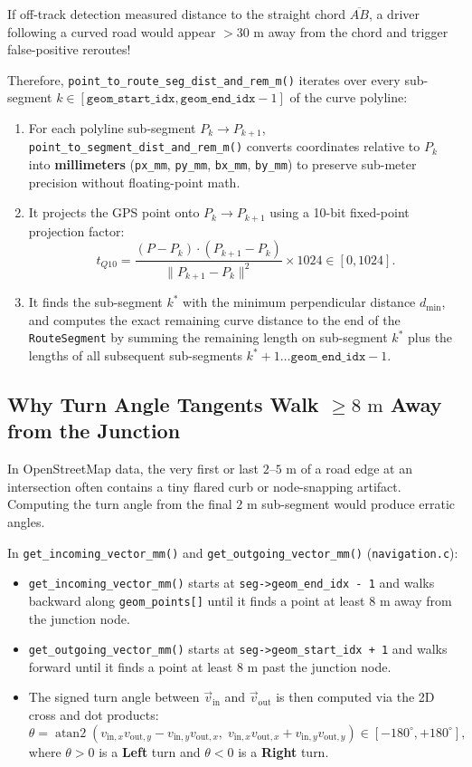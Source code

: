 \documentclass[11pt,a4paper]{article}
\begin{document}
If off-track detection measured distance to the straight chord $\overline{AB}$, a driver following a curved road would appear $>30\text{ m}$ away from the chord and trigger false-positive reroutes!

Therefore, \texttt{point\_to\_route\_seg\_dist\_and\_rem\_m()} iterates over every sub-segment $k \in [\texttt{geom\_start\_idx}, \texttt{geom\_end\_idx} - 1]$ of the curve polyline:
\begin{enumerate}
    \item For each polyline sub-segment $P_k \to P_{k+1}$, \texttt{point\_to\_segment\_dist\_and\_rem\_m()} converts coordinates relative to $P_k$ into \textbf{millimeters} (\texttt{px\_mm}, \texttt{py\_mm}, \texttt{bx\_mm}, \texttt{by\_mm}) to preserve sub-meter precision without floating-point math.
    \item It projects the GPS point onto $P_k \to P_{k+1}$ using a 10-bit fixed-point projection factor:
    \[
        t_{Q10} = \frac{(P - P_k) \cdot (P_{k+1} - P_k)}{\|P_{k+1} - P_k\|^2} \times 1024 \in [0, 1024].
    \]
    \item It finds the sub-segment $k^*$ with the minimum perpendicular distance $d_{\min}$, and computes the exact remaining curve distance to the end of the \texttt{RouteSegment} by summing the remaining length on sub-segment $k^*$ plus the lengths of all subsequent sub-segments $k^* + 1 \dots \texttt{geom\_end\_idx} - 1$.
\end{enumerate}

\subsection{Why Turn Angle Tangents Walk $\ge 8\text{ m}$ Away from the Junction}

In OpenStreetMap data, the very first or last $2\text{--}5\text{ m}$ of a road edge at an intersection often contains a tiny flared curb or node-snapping artifact. Computing the turn angle from the final $2\text{ m}$ sub-segment would produce erratic angles.

In \texttt{get\_incoming\_vector\_mm()} and \texttt{get\_outgoing\_vector\_mm()} (\texttt{navigation.c}):
\begin{itemize}
    \item \texttt{get\_incoming\_vector\_mm()} starts at \texttt{seg->geom\_end\_idx - 1} and walks backward along \texttt{geom\_points[]} until it finds a point at least \textbf{$8\text{ m}$} away from the junction node.
    \item \texttt{get\_outgoing\_vector\_mm()} starts at \texttt{seg->geom\_start\_idx + 1} and walks forward until it finds a point at least \textbf{$8\text{ m}$} past the junction node.
    \item The signed turn angle between $\vec{v}_{\text{in}}$ and $\vec{v}_{\text{out}}$ is then computed via the 2D cross and dot products:
    \[
        \theta = \operatorname{atan2}\!\left(v_{\text{in},x} v_{\text{out},y} - v_{\text{in},y} v_{\text{out},x},\; v_{\text{in},x} v_{\text{out},x} + v_{\text{in},y} v_{\text{out},y}\right) \in [-180^\circ, +180^\circ],
    \]
    where $\theta > 0$ is a \textbf{Left} turn and $\theta < 0$ is a \textbf{Right} turn.
\end{itemize}
\end{document}
